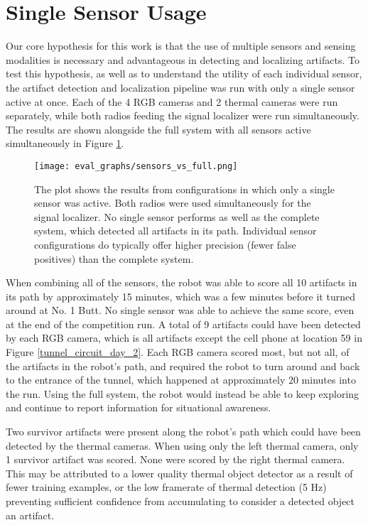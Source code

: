 \section{Single Sensor Usage}

Our core hypothesis for this work is that the use of multiple sensors and sensing modalities is necessary and advantageous in detecting and localizing artifacts. To test this hypothesis, as well as to understand the utility of each individual sensor, the artifact detection and localization pipeline was run with only a single sensor active at once. Each of the 4 RGB cameras and 2 thermal cameras were run separately, while both radios feeding the signal localizer were run simultaneously. The results are shown alongside the full system with all sensors active simultaneously in Figure \ref{sensors_vs_full}.

\begin{figure}	
	\centering
	\texttt{[image: eval\_graphs/sensors\_vs\_full.png]}
	\caption[Single sensor artifact localization]{The plot shows the results from configurations in which only a single sensor was active. Both radios were used simultaneously for the signal localizer. No single sensor performs as well as the complete system, which detected all artifacts in its path. Individual sensor configurations do typically offer higher precision (fewer false positives) than the complete system.}
	\label{sensors_vs_full}
\end{figure}

When combining all of the sensors, the robot was able to score all 10 artifacts in its path by approximately 15 minutes, which was a few minutes before it turned around at No. 1 Butt. No single sensor was able to achieve the same score, even at the end of the competition run. A total of 9 artifacts could have been detected by each RGB camera, which is all artifacts except the cell phone at location 59 in Figure \ref{tunnel_circuit_day_2}. Each RGB camera scored most, but not all, of the artifacts in the robot's path, and required the robot to turn around and back to the entrance of the tunnel, which happened at approximately 20 minutes into the run. Using the full system, the robot would instead be able to keep exploring and continue to report information for situational awareness. 

Two survivor artifacts were present along the robot's path which could have been detected by the thermal cameras. When using only the left thermal camera, only 1 survivor artifact was scored. None were scored by the right thermal camera. This may be attributed to a lower quality thermal object detector as a result of fewer training examples, or the low framerate of thermal detection (5 Hz) preventing sufficient confidence from accumulating to consider a detected object an artifact.

